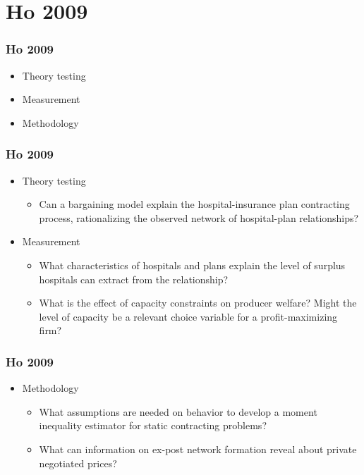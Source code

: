 \section{Ho 2009}

\begin{frame}
\frametitle{Ho 2009}

\begin{itemize}
	\item Theory testing
	\item Measurement
	\item Methodology
\end{itemize}
\end{frame}


\begin{frame}
\frametitle{Ho 2009}

\begin{itemize}
	\item Theory testing
         \begin{itemize}
	\item Can a bargaining model explain the hospital-insurance plan contracting process, rationalizing the observed network of hospital-plan relationships? 	\end{itemize}
	\item Measurement
	\begin{itemize}
	\item What characteristics of hospitals and plans explain the level of surplus hospitals can extract from the relationship?
	\item What is the effect of capacity constraints on producer welfare?  Might the level of capacity be a relevant choice variable for a profit-maximizing firm?
	\end{itemize}
\end{itemize}
\end{frame}


\begin{frame}
\frametitle{Ho 2009}

\begin{itemize}
	\item Methodology
	\begin{itemize}
	\item What assumptions are needed on behavior to develop a moment inequality estimator for static contracting problems?
	\item What can information on ex-post network formation reveal about private negotiated prices?
	\end{itemize}
\end{itemize}
\end{frame}

